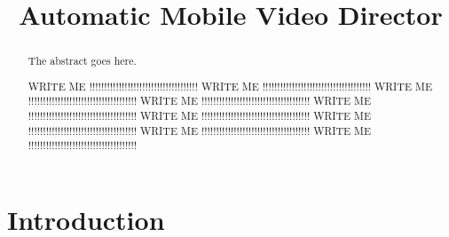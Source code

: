 \documentclass[conference]{IEEEtran}
\begin{document}
\title{Automatic Mobile Video Director}

\author{
\and
\and
\and
}


\maketitle

\begin{abstract}
The abstract goes here.

WRITE ME !!!!!!!!!!!!!!!!!!!!!!!!!!!!!!!!!!!!!
WRITE ME !!!!!!!!!!!!!!!!!!!!!!!!!!!!!!!!!!!!!
WRITE ME !!!!!!!!!!!!!!!!!!!!!!!!!!!!!!!!!!!!!
WRITE ME !!!!!!!!!!!!!!!!!!!!!!!!!!!!!!!!!!!!!
WRITE ME !!!!!!!!!!!!!!!!!!!!!!!!!!!!!!!!!!!!!
WRITE ME !!!!!!!!!!!!!!!!!!!!!!!!!!!!!!!!!!!!!
WRITE ME !!!!!!!!!!!!!!!!!!!!!!!!!!!!!!!!!!!!!
WRITE ME !!!!!!!!!!!!!!!!!!!!!!!!!!!!!!!!!!!!!
WRITE ME !!!!!!!!!!!!!!!!!!!!!!!!!!!!!!!!!!!!!

\end{abstract}

\section{Introduction}
\end{document}
